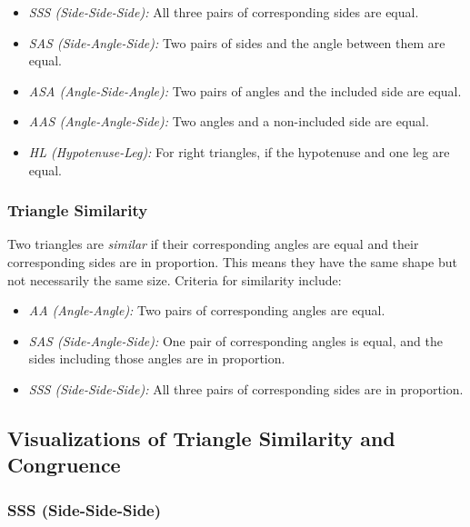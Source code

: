 \begin{itemize}

	\item \emph{SSS (Side-Side-Side):} All three pairs of corresponding sides are equal.

	\item \emph{SAS (Side-Angle-Side):} Two pairs of sides and the angle between them are equal.

	\item \emph{ASA (Angle-Side-Angle):} Two pairs of angles and the included side are equal.

	\item \emph{AAS (Angle-Angle-Side):} Two angles and a non-included side are equal.

	\item \emph{HL (Hypotenuse-Leg):} For right triangles, if the hypotenuse and one leg are equal.

\end{itemize}

\subsubsection{Triangle Similarity}
Two triangles are \emph{similar} if their corresponding angles are equal and their corresponding sides 
are in proportion. This means they have the same shape but not necessarily the same size. Criteria for 
similarity include:

\begin{itemize}

	\item \emph{AA (Angle-Angle):} Two pairs of corresponding angles are equal.

	\item \emph{SAS (Side-Angle-Side):} One pair of corresponding angles is equal, and the sides including 
	those angles are in proportion.

	\item \emph{SSS (Side-Side-Side):} All three pairs of corresponding sides are in proportion.

\end{itemize}

\subsection{Visualizations of Triangle Similarity and Congruence}

\subsubsection{SSS (Side-Side-Side)}

